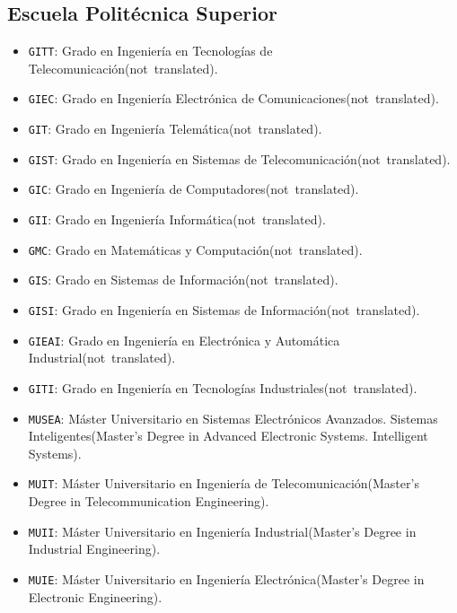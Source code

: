 \subsection {Escuela Politécnica Superior}
\begin {itemize}
\item \texttt {GITT}: Grado en Ingeniería en Tecnologías de Telecomunicación\nobreakspace {}(\mbox {not translated}).
\item \texttt {GIEC}: Grado en Ingeniería Electrónica de Comunicaciones\nobreakspace {}(\mbox {not translated}).
\item \texttt {GIT}: Grado en Ingeniería Telemática\nobreakspace {}(\mbox {not translated}).
\item \texttt {GIST}: Grado en Ingeniería en Sistemas de Telecomunicación\nobreakspace {}(\mbox {not translated}).
\item \texttt {GIC}: Grado en Ingeniería de Computadores\nobreakspace {}(\mbox {not translated}).
\item \texttt {GII}: Grado en Ingeniería Informática\nobreakspace {}(\mbox {not translated}).
\item \texttt {GMC}: Grado en Matemáticas y Computación\nobreakspace {}(\mbox {not translated}).
\item \texttt {GIS}: Grado en Sistemas de Información\nobreakspace {}(\mbox {not translated}).
\item \texttt {GISI}: Grado en Ingeniería en Sistemas de Información\nobreakspace {}(\mbox {not translated}).
\item \texttt {GIEAI}: Grado en Ingeniería en Electrónica y Automática Industrial\nobreakspace {}(\mbox {not translated}).
\item \texttt {GITI}: Grado en Ingeniería en Tecnologías Industriales\nobreakspace {}(\mbox {not translated}).
\item \texttt {MUSEA}: Máster Universitario en Sistemas Electrónicos Avanzados. Sistemas Inteligentes\nobreakspace {}(Master's Degree in Advanced Electronic Systems. Intelligent Systems).
\item \texttt {MUIT}: Máster Universitario en Ingeniería de Telecomunicación\nobreakspace {}(Master's Degree in Telecommunication Engineering).
\item \texttt {MUII}: Máster Universitario en Ingeniería Industrial\nobreakspace {}(Master's Degree in Industrial Engineering).
\item \texttt {MUIE}: Máster Universitario en Ingeniería Electrónica\nobreakspace {}(Master's Degree in Electronic Engineering).

\end{itemize}
